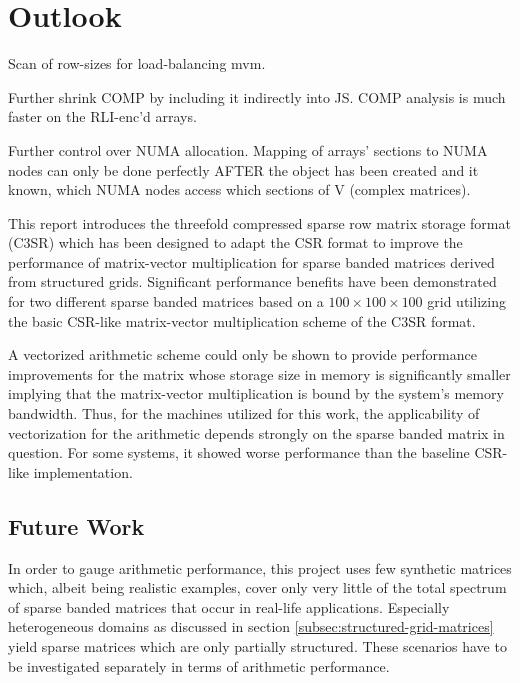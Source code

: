 \chapter{Outlook}

Scan of row-sizes for load-balancing mvm.

Further shrink COMP by including it indirectly into JS. COMP analysis is much faster on the RLI-enc'd arrays.

Further control over NUMA allocation. Mapping of arrays' sections to NUMA nodes can only be done perfectly AFTER the
object has been created and it known, which NUMA nodes access which sections of V (complex matrices).




  This report introduces the threefold compressed sparse row matrix storage format (C3SR) which has been designed to
  adapt the CSR format to improve the performance of matrix-vector multiplication for sparse banded matrices derived
  from structured grids. Significant performance benefits have been demonstrated for two different sparse banded
  matrices based on a $100 \times 100 \times 100$ grid utilizing the basic CSR-like matrix-vector multiplication scheme
  of the C3SR format.

  A vectorized arithmetic scheme could only be shown to provide performance improvements for the matrix whose storage
  size in memory is significantly smaller implying that the matrix-vector multiplication is bound by the system's memory
  bandwidth. Thus, for the machines utilized for this work, the applicability of vectorization for the arithmetic
  depends strongly on the sparse banded matrix in question. For some systems, it showed worse performance than the
  baseline CSR-like implementation.

  \section*{Future Work}

    In order to gauge arithmetic performance, this project uses few synthetic matrices which, albeit being realistic
    examples, cover only very little of the total spectrum of sparse banded matrices that occur in real-life
    applications. Especially heterogeneous domains as discussed in section \ref{subsec:structured-grid-matrices} yield
    sparse matrices which are only partially structured. These scenarios have to be investigated separately in terms of
    arithmetic performance.
